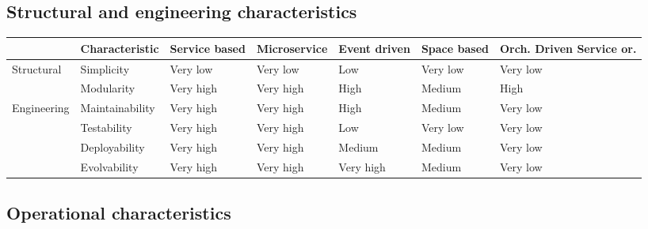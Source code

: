 \subsection{Structural and engineering characteristics}

\begin{table}[h!]
  \renewcommand{\arraystretch}{1.3}
  \centering
  \begin{tabularx}{\textwidth}{l l X X X X X}
    \toprule
     & \textbf{Characteristic} & \textbf{Service based} & \textbf{Microservice} & \textbf{Event driven} & \textbf{Space based} & \textbf{Orch. Driven Service or.} \\
    \midrule
    \multirow{2}{*}{Structural}
     & Simplicity              & Very low               & Very low              & Low                   & Very low             & Very low                          \\
     & Modularity              & Very high              & Very high             & High                  & Medium               & High                              \\
    \midrule
    \multirow{4}{*}{Engineering}
     & Maintainability         & Very high              & Very high             & High                  & Medium               & Very low                          \\
     & Testability             & Very high              & Very high             & Low                   & Very low             & Very low                          \\
     & Deployability           & Very high              & Very high             & Medium                & Medium               & Very low                          \\
     & Evolvability            & Very high              & Very high             & Very high             & Medium               & Very low                          \\
    \bottomrule
  \end{tabularx}
\end{table}

\subsection{Operational characteristics}

